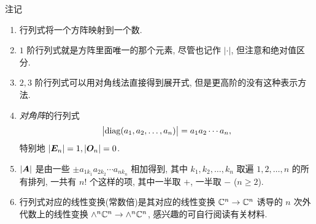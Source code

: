 \begin{frame}{注记}
	\begin{enumerate}
		\item 行列式将一个方阵映射到一个数.
		\item $1$ 阶行列式就是方阵里面唯一的那个元素, 尽管也记作 $|\cdot|$, 但注意和绝对值区分.
		\item $2,3$ 阶行列式可以用对角线法直接得到展开式, 但是更高阶的没有这种表示方法.
		\item \emph{对角阵}的行列式
		\[\bigl|{\mathrm{diag}}(a_1,a_2,\dots,a_n)\bigr|=a_1a_2\cdots a_n,\]
		特别地 $|{\boldsymbol{E}}_n|=1,|{\boldsymbol{O}}_n|=0$.
		\item $|{\boldsymbol{A}}|$ 是由一些 $\pm a_{1 k_1}a_{2 k_2}\cdots a_{n k_n}$ 相加得到, 其中 $k_1,k_2,\dots,k_n$ 取遍 $1,2,\dots,n$ 的所有排列, 一共有 $n!$ 个这样的项, 其中一半取 $+$, 一半取 $-$ ($n\ge2$).
		\item 行列式对应的线性变换(常数倍)是其对应的线性变换 ${\mathbb{C}}^n\rightarrow{\mathbb{C}}^n$ 诱导的 $n$ 次外代数上的线性变换 $\wedge^n{\mathbb{C}}^n\rightarrow \wedge^n{\mathbb{C}}^n$, 感兴趣的可自行阅读有关材料.
	\end{enumerate}
\end{frame}




